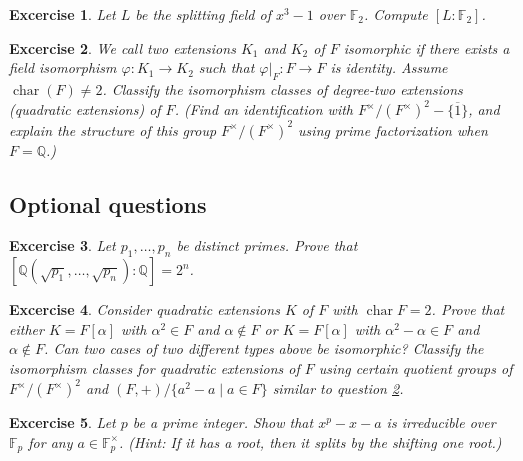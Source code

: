 \documentclass{article}
\newtheorem{exer}{Excercise}
\newcommand{\Q}{\mathbb{Q}}
\newcommand{\F}{\mathbb{F}}
\newcommand{\ch}{\operatorname{char}}
\begin{document}
\begin{exer}
Let $L$ be the splitting field of $x^3 - 1$ over $\F_2$. Compute $[L:\F_2]$.
\end{exer}


\begin{exer}
    \label{ex:quadratic}    
We call two extensions $K_1$ and $K_2$ of $F$ isomorphic if there exists a field isomorphism $\varphi\colon K_1\to K_2$ such that $\varphi|_F\colon F\to F$ is identity. Assume $\ch(F)\neq 2$. Classify the isomorphism classes of degree-two extensions (quadratic extensions) of $F$. (Find an identification with $F^\times/(F^\times)^2-\{\overline{1}\}$, and explain the structure of this group $F^\times/(F^\times)^2$ using prime factorization when $F=\Q$.)
\end{exer}

\subsection{Optional questions}

\begin{exer}
Let $p_1, \ldots, p_n$ be distinct primes. Prove that $[\Q(\sqrt{p_1}, \ldots, \sqrt{p_n}):\Q] = 2^n$.
\end{exer}


\begin{exer}
Consider quadratic extensions $K$ of $F$ with $\ch F=2$. Prove that either $K=F[\alpha]$ with $\alpha^2\in F$ and $\alpha\not\in F$ or $K=F[\alpha]$ with $\alpha^2-\alpha\in F$ and $\alpha\not\in F$. Can two cases of two different types above be isomorphic? Classify the isomorphism classes for quadratic extensions of $F$ using certain quotient groups of $F^\times/(F^\times)^2$ and $(F, +)/\{a^2-a \mid a\in F\}$ similar to question \ref{ex:quadratic}. 
\end{exer}


\begin{exer}
 Let $p$ be a prime integer. Show that $x^p-x-a$ is irreducible over $\F_p$ for any $a\in \F_p^\times $. (Hint: If it has a root, then it splits by the shifting one root.)
\end{exer}
\end{document}
